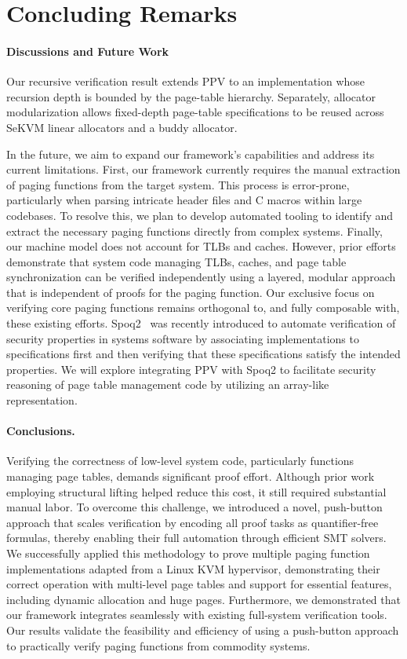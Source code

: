 \section{Concluding Remarks}
\label{sec:concl}

\paragraph{Discussions and Future Work}
{\color{blue}Our recursive verification result extends PPV to an implementation whose recursion depth is bounded by the page-table hierarchy. Separately, allocator modularization allows fixed-depth page-table specifications to be reused across SeKVM linear allocators and a buddy allocator.}

In the future, we aim to expand our framework's capabilities and address its current limitations. {\color{blue}First,} our framework currently requires the manual extraction of paging functions from the target system. This process is error-prone, particularly when parsing intricate header files and C macros within large codebases. To resolve this, we plan to develop automated tooling to identify and extract the necessary paging functions directly from complex systems. Finally, our machine model does not account for TLBs and caches. However, prior efforts~\cite{certikos,li:ieeesp2021,taososp21,li:sekvm:usenix21} demonstrate that system code managing TLBs, caches, and page table synchronization can be verified independently using a layered, modular approach that is independent of proofs for the paging function. Our exclusive focus on verifying core paging functions remains orthogonal to, and fully composable with, these existing efforts. Spoq2~\cite{spoq2} was recently introduced to automate verification of security properties in systems software by associating implementations to specifications first and then verifying that these specifications satisfy the intended properties. We will explore integrating PPV with Spoq2 to facilitate security reasoning of page table management code by utilizing an array-like representation.

\paragraph{Conclusions.} Verifying the correctness of low-level system code, particularly functions managing page tables, demands significant proof effort. Although prior work employing structural lifting helped reduce this cost, it still required substantial manual labor. To overcome this challenge, we introduced a novel, push-button approach that scales verification by encoding all proof tasks as quantifier-free formulas, thereby enabling their full automation through efficient SMT solvers. We successfully applied this methodology to prove multiple paging function implementations adapted from a Linux KVM hypervisor, demonstrating their correct operation with multi-level page tables and support for essential features, including dynamic allocation and huge pages. Furthermore, we demonstrated that our framework integrates seamlessly with existing full-system verification tools. Our results validate the feasibility and efficiency of using a push-button approach to practically verify paging functions from commodity systems.
